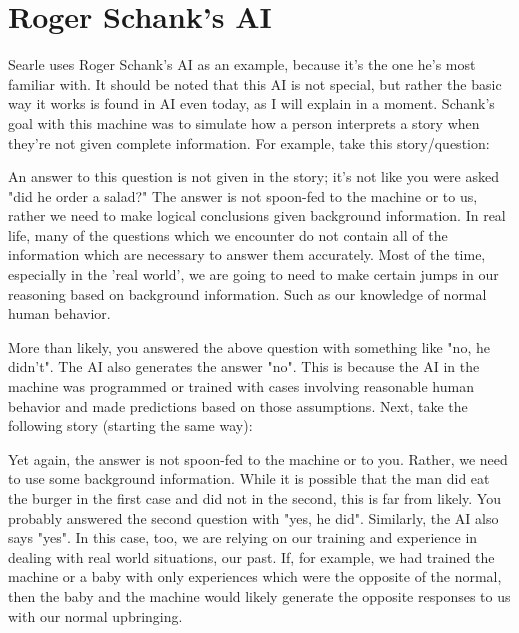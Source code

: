 \section{Roger Schank's AI}
Searle uses Roger Schank's AI as an example, because it's the one he's most familiar with. It should be noted that this AI is not special, but rather the basic way it works is found in AI even today, as I will explain in a moment. Schank's goal with this machine was to simulate how a person interprets a story when they're not given complete information. For example, take this story/question:


An answer to this question is not given in the story; it's not like you were asked "did he order a salad?" The answer is not spoon-fed to the machine or to us, rather we need to make logical conclusions given background information. In real life, many of the questions which we encounter do not contain all of the information which are necessary to answer them accurately. Most of the time, especially in the 'real world', we are going to need to make certain jumps in our reasoning based on background information. Such as our knowledge of normal human behavior.

More than likely, you answered the above question with something like "no, he didn't". The AI also generates the answer "no". This is because the AI in the machine was programmed or trained with cases involving reasonable human behavior and made predictions based on those assumptions. Next, take the following story (starting the same way):


Yet again, the answer is not spoon-fed to the machine or to you. Rather, we need to use some background information. While it is possible that the man did eat the burger in the first case and did not in the second, this is far from likely. You probably answered the second question with "yes, he did". Similarly, the AI also says "yes". In this case, too, we are relying on our training and experience in dealing with real world situations, our past. If, for example, we had trained the machine or a baby with only experiences which were the opposite of the normal, then the baby and the machine would likely generate the opposite responses to us with our normal upbringing. 

